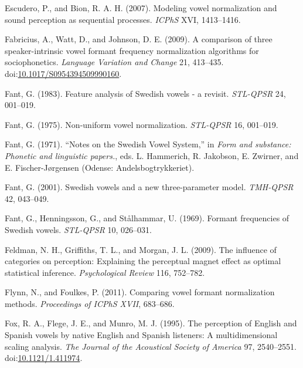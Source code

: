 \documentclass[utf8]{frontiersSCNS}
\newlength{\cslhangindent}
\newlength{\cslentryspacingunit} %
\newenvironment{CSLReferences}[2] %
 {%
  \setlength{\parindent}{0pt}
  \ifodd #1
  \let\oldpar\par
  \def\par{\hangindent=\cslhangindent\oldpar}
  \fi
  \setlength{\parskip}{#2\cslentryspacingunit}
 }%
 {}
\begin{document}
\begin{CSLReferences}{1}{0}
\leavevmode{}%
Escudero, P., and Bion, R. A. H. (2007). Modeling vowel normalization and sound perception as sequential processes. \emph{ICPhS} XVI, 1413--1416.

\leavevmode{}%
Fabricius, A., Watt, D., and Johnson, D. E. (2009). A comparison of three speaker-intrinsic vowel formant frequency normalization algorithms for sociophonetics. \emph{Language Variation and Change} 21, 413--435. doi:\href{https://doi.org/10.1017/S0954394509990160}{10.1017/S0954394509990160}.

\leavevmode{}%
Fant, G. (1983). Feature analysis of {Swedish} vowels - a revisit. \emph{STL-QPSR} 24, 001--019.

\leavevmode{}%
Fant, G. (1975). Non-uniform vowel normalization. \emph{STL-QPSR} 16, 001--019.

\leavevmode{}%
Fant, G. (1971). {``Notes on the {Swedish Vowel System},''} in \emph{Form and substance: Phonetic and linguistic papers.}, eds. L. Hammerich, R. Jakobson, E. Zwirner, and E. Fischer-Jørgensen ({Odense}: {Andelsbogtrykkeriet}).

\leavevmode{}%
Fant, G. (2001). Swedish vowels and a new three-parameter model. \emph{TMH-QPSR} 42, 043--049.

\leavevmode{}%
Fant, G., Henningsson, G., and Stålhammar, U. (1969). Formant frequencies of {Swedish} vowels. \emph{STL-QPSR} 10, 026--031.

\leavevmode{}%
Feldman, N. H., Griffiths, T. L., and Morgan, J. L. (2009). The influence of categories on perception: {Explaining} the perceptual magnet effect as optimal statistical inference. \emph{Psychological Review} 116, 752--782.

\leavevmode{}%
Flynn, N., and Foulkes, P. (2011). Comparing vowel formant normalization methods. \emph{Proceedings of ICPhS XVII}, 683--686.

\leavevmode{}%
Fox, R. A., Flege, J. E., and Munro, M. J. (1995). The perception of {English} and {Spanish} vowels by native {English} and {Spanish} listeners: {A} multidimensional scaling analysis. \emph{The Journal of the Acoustical Society of America} 97, 2540--2551. doi:\href{https://doi.org/10.1121/1.411974}{10.1121/1.411974}.


\end{CSLReferences}
\end{document}
